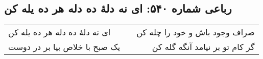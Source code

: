 \begin{center}
\section*{رباعی شماره ۵۴۰: ای نه دلهٔ ده دله هر ده یله کن}
\label{sec:sh540}
\begin{longtable}{l p{0.5cm} r}
ای نه دلهٔ ده دله هر ده یله کن
&&
صراف وجود باش و خود را چله کن
\\
یک صبح با خلاص بیا بر در دوست
&&
گر کام تو بر نیامد آنگه گله کن
\\
\end{longtable}
\end{center}
